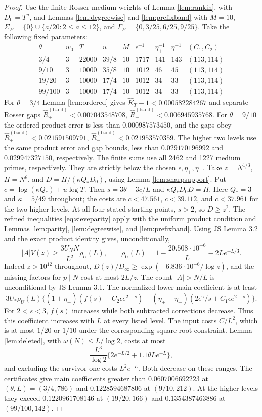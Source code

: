 \documentclass[11pt]{article}
\newcommand{\om}{\omega}
\begin{document}
\begin{proof}
Use the finite Rosser medium weights of Lemma \ref{lem:rankin},
with $D_0=T^u$, and Lemmas \ref{lem:degreewise} and
\ref{lem:prefixband} with $M=10$,
$\Sigma_E=\{0\}\cup\{a/20:2\le a\le12\}$, and
$\Gamma_E=\{0,3/25,6/25,9/25\}$.
Take the following fixed parameters:
\[
\begin{array}{c|r|r|c|c|r|r|r|c}
\theta&w_0&T&u&M&\epsilon^{-1}&\eta_+^{-1}&\eta_-^{-1}&(C_1,C_2)\\\hline
3/4&3&22000&39/8&10&1717&141&143&(113,114)\\
9/10&3&10000&35/8&10&1012&46&45&(113,114)\\
19/20&3&10000&17/4&10&1012&34&33&(113,114)\\
99/100&3&10000&17/4&10&1012&34&33&(113,114)
\end{array}
\]
For $\theta=3/4$ Lemma \ref{lem:ordered} gives
$\widehat K_T-1<0.000582284267$
and separate Rosser gaps
$\widehat R^{(\mathrm{band})}_+<0.007043548708$,
$\widehat R^{(\mathrm{band})}_-<0.006945935768$.
For $\theta=9/10$ the ordered product error is less than $0.000987573450$,
and the gaps obey
$\widehat R^{(\mathrm{band})}_+<0.021591509791$,
$\widehat R^{(\mathrm{band})}_-<0.021953570359$.
The higher two levels use the same product error and gap bounds,
less than $0.029170196992$ and $0.029947327150$, respectively.
The finite sums use all 2462 and 1227 medium primes, respectively.
They are strictly below the chosen $\epsilon,\eta_+,\eta_-$.
Take $z=N^{1/3}$, $H=N^\theta$, and
$D=H/(\kappa Q_*D_0)$, using Lemma \ref{lem:sharpsupport}.
Put $c=\log(\kappa Q_*)+u\log T$.
Then $s=3\theta-3c/L$ and $\kappa Q_*D_0D=H$.
Here $Q_*=3$ and $\kappa=5/49$ throughout; the costs are
$c<47.561$, $c<39.112$, and $c<37.961$ for the two higher levels.
At all four stated starting points, $s>2$, so $D\ge z^2$.
The refined inequalities \eqref{eq:sieveparity} apply with the
uniform product condition and Lemmas \ref{lem:parity},
\ref{lem:degreewise}, and \ref{lem:prefixband}.
Using JS Lemma 3.2 and the exact product identity gives, unconditionally,
\[
|A|V(z)\ge\frac{3U_NN}{L^2}\rho_U(L),\qquad
\rho_U(L)=1-\frac{20.508\cdot10^{-6}}{L}-2Le^{-L/3}.
\]
Indeed $z>10^{12}$ throughout, $D(z)/D_\infty\ge
\exp(-6.836\cdot10^{-6}/\log z)$, and the missing factors for
$p\mid N$ cost at most $2L/z$. The count $|A|>N/L$ is
unconditional by JS Lemma 3.1.
The normalized lower main coefficient is at least
\[
3U_*\rho_U(L)\{(1+\eta_+)(f(s)-C_2\epsilon e^{2-s})
-(\eta_++\eta_-)(2e^\gamma/s+C_1\epsilon e^{2-s})\}.
\]
For $2<s<3$, $f(s)$ increases while both subtracted corrections
decrease. Thus this coefficient increases with $L$ at every listed level.
The input costs $C/L^2$, which is at most $1/20$ or $1/10$
under the corresponding square-root constraint.
Lemma \ref{lem:deleted}, with $\om(N)\le L/\log2$, costs at most
\[
\frac{L^3}{\log2}\{2e^{-L/2}+1.1\theta Le^{-L}\},
\]
and excluding the survivor one costs $L^2e^{-L}$. Both decrease on
these ranges. The certificates give main coefficients greater than
$0.0607006692223$ at $(\theta,L)=(3/4,786)$ and
$0.1228594687806$ at $(9/10,212)$. At the higher levels they exceed
$0.1220961708146$ at $(19/20,166)$ and
$0.1354387463886$ at $(99/100,142)$.


\end{proof}
\end{document}
